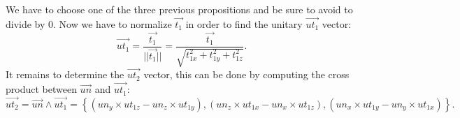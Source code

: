 We have to choose one of the three previous propositions and be sure to avoid to divide by 0.
Now we have to normalize $\vec{t_1}$ in order to find the unitary $\vec{ut_1}$ vector:
\begin{equation*}
	\vec{ut_1} = \frac{\vec{t_1}}{||\vec{t_1}||} = \frac{\vec{t_1}}{\sqrt{t_{1x}^2 + t_{1y}^2 + t_{1z}^2}}.
\end{equation*}
It remains to determine the $\vec{ut_2}$ vector, this can be done by computing the cross product between $\vec{un}$ and $\vec{ut_1}$:
\begin{equation*}
	\vec{ut_2} = \vec{un} \wedge \vec{ut_1} = \left\{ (un_y \times ut_{1z} - un_z \times ut_{1y}), (un_z \times ut_{1x} - un_x \times ut_{1z}), (un_x \times ut_{1y} - un_y \times ut_{1x})\right\}.
\end{equation*}
